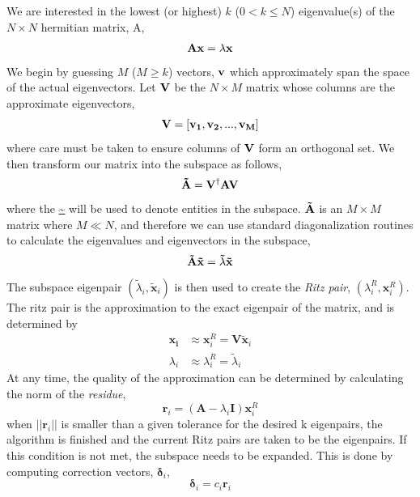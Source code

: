 \documentclass{revtex4}
\begin{document}
We are interested in the lowest (or highest) $k$ ($0 < k \leq N$) eigenvalue(s) of the $N \times N$ hermitian matrix, A,
\begin{equation}
\bf{Ax}=\lambda\bf{x}
\end{equation}
We begin by guessing $M$ ($M \geq k$) vectors, $\bf{v}$ which approximately span the space of the actual eigenvectors. Let $\bf{V}$ be the $N\times M$ matrix whose columns are the approximate eigenvectors, 
\begin{equation}
\bf{V}=[\bf{v_1,v_2,...,v_M}]	
\end{equation}
where care must be taken to ensure columns of $\bf{V}$ form an orthogonal set. We then transform our matrix into the subspace as follows, 
\begin{equation}
\bf{\tilde{A}} = \bf{V}^\dag\bf{AV}
\end{equation}
where the \url{~} will be used to denote entities in the subspace. $\bf{\tilde{A}}$ is an $M \times M$ matrix where $M \ll N$, and therefore we can use standard diagonalization routines to calculate the eigenvalues and eigenvectors in the subspace, 
\begin{equation}
\bf{\tilde{A}\tilde{x}}=\tilde{\lambda}\bf{\tilde{x}}
\end{equation}
The subspace eigenpair $(\tilde{\lambda}_i,\mathbf{\tilde{x}}_i)$ is then used to create the \emph{Ritz pair}, $({\lambda_i^R},\mathbf{x}_i^R)$. The ritz pair is the approximation to the exact eigenpair of the matrix, and is determined by
\begin{subequations}
	\begin{align}
	 \mathbf{x_i} &\approx \mathbf{x}_i^R = \mathbf{V\tilde{x}}_i\\
	 \lambda_i &\approx \lambda_i^R = \tilde{\lambda}_i
	\end{align}
\end{subequations}
At any time, the quality of the approximation can be determined by calculating the norm of the \emph{residue},
\begin{equation}
\mathbf{r}_i=\left(\mathbf{A}-\lambda_i\mathbf{I}\right)\mathbf{x}_i^R
\end{equation}
when $||\mathbf{r}_i||$ is smaller than a given tolerance for the desired k eigenpairs, the algorithm is finished and the current Ritz pairs are taken to be the eigenpairs. If this condition is not met, the subspace needs to be expanded. This is done by computing correction vectors, $\mathbf{\delta}_i$,
\begin{equation}
\mathbf{\delta}_i = c_i\mathbf{r}_i
\end{equation}
\end{document}
